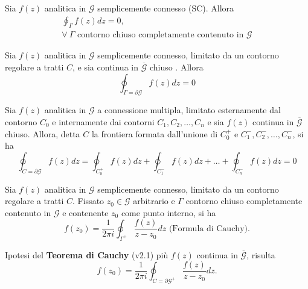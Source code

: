 \begin{theorem}[di Cauchy (v1.1)]
\label{cauchy1v1}
    Sia $f(z)$ analitica in $\mathcal{G}$ semplicemente connesso (SC). Allora
    \begin{gather*}
        \oint_\Gamma f(z)dz = 0, \\ \forall\  \Gamma \text{ contorno chiuso completamente contenuto in }\mathcal{G}
    \end{gather*}
\end{theorem}
\begin{theorem}[di Cauchy (v1.2)]
\label{cauchy1v2}
    Sia $f(z)$ analitica in $\mathcal{G}$ semplicemente connesso, limitato da un contorno regolare a tratti $C$, e sia continua in $\overline{\mathcal{G}}$ chiuso . Allora
    \[
        \oint_{\Gamma=\partial\mathcal{G}} f(z)dz = 0
    \]
\end{theorem}
\begin{theorem}[di Cauchy (v1.3)]
\label{cauchy1v3}
    Sia $f(z)$ analitica in $\mathcal{G}$ a connessione multipla, limitato esternamente dal contorno $C_0$ e internamente dai contorni $C_1, C_2, \dots, C_n$ e sia $f(z)$ continua in $\overline{\mathcal{G}}$ chiuso. Allora, detta $C$ la frontiera formata dall'unione di $C_0^+\text{ e } C_1^-, C_2^-, \dots, C_n^-$, si ha
    \[
        \oint_{C=\partial\mathcal{G}} f(z)dz = \oint_{C_0^+} f(z)dz + \oint_{C_1^-} f(z)dz +\dots + \oint_{C_n^-} f(z)dz =0
    \]
\end{theorem}
\begin{theorem}[di Cauchy (v2.1)]
    \label{cauchy2v1}
    Sia $f(z)$ analitica in $\mathcal{G}$ semplicemente connesso, limitato da un contorno regolare a tratti $C$. Fissato $z_0\in\mathcal{G}$ arbitrario e $\Gamma$ contorno chiuso completamente contenuto in $\mathcal{G}$ e contenente $z_0$ come punto interno, si ha
    \[
        f(z_0) = \frac{1}{2\pi i} \oint_{\Gamma^+}\frac{f(z)}{z-z_0}dz \text{  (Formula di Cauchy)}.
    \]
\end{theorem}
\begin{theorem}[di Cauchy (v2.2)]
    Ipotesi del \textbf{Teorema di Cauchy} (v2.1) più $f(z)$ continua in $\overline{\mathcal{G}}$, risulta 
    \[
        f(z_0) = \frac{1}{2\pi i} \oint_{C=\partial\mathcal{G}^+}\frac{f(z)}{z-z_0}dz.
    \]
\end{theorem}
